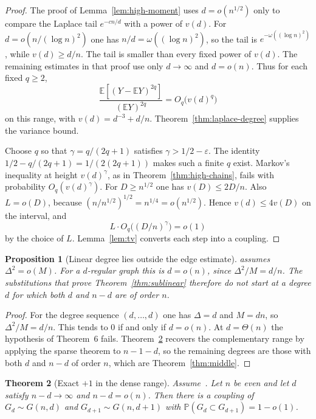 \documentclass[11pt]{article}
\newtheorem{theorem}{Theorem}
\newtheorem{proposition}[theorem]{Proposition}
\newcommand{\Gnd}{G(n,d)}
\newcommand{\EE}{\mathbb{E}}
\newcommand{\PP}{\mathbb{P}}
\begin{document}
\begin{proof}
The proof of Lemma~\ref{lem:high-moment} uses \(d=o(n^{1/2})\) only to compare the
Laplace tail \(e^{-cn/d}\) with a power of \(v(d)\). For
\(d=o(n/(\log n)^2)\) one has \(n/d=\omega((\log n)^2)\), so the tail is
\(e^{-\omega((\log n)^2)}\), while \(v(d)\ge d/n\). The tail is smaller than every
fixed power of \(v(d)\). The remaining estimates in that proof use only
\(d\to\infty\) and \(d=o(n)\). Thus for each fixed \(q\ge 2\),
\[
\frac{\EE[(Y-\EE Y)^{2q}]}{(\EE Y)^{2q}}=O_q\bigl(v(d)^q\bigr)
\]
on this range, with \(v(d)=d^{-3}+d/n\). Theorem~\ref{thm:laplace-degree} supplies
the variance bound.

Choose \(q\) so that \(\gamma=q/(2q+1)\) satisfies \(\gamma>1/2-\varepsilon\). The identity
\(1/2-q/(2q+1)=1/(2(2q+1))\) makes such a finite \(q\) exist. Markov's inequality
at height \(v(d)^\gamma\), as in Theorem~\ref{thm:high-chains}, fails with
probability \(O_q(v(d)^\gamma)\). For \(D\ge n^{1/2}\) one has \(v(D)\le 2D/n\).
Also \(L=o(D)\), because \((n/n^{1/2})^{1/2}=n^{1/4}=o(n^{1/2})\). Hence
\(v(d)\le 4v(D)\) on the interval, and
\[
L\cdot O_q\bigl((D/n)^\gamma\bigr)=o(1)
\]
by the choice of \(L\). Lemma~\ref{lem:tv} converts each step into a coupling.
\end{proof}

\begin{proposition}[Linear degree lies outside the edge estimate]
\label{prop:linear-barrier}
\cite[Theorem~6]{Gao20} assumes \(\Delta^2=o(M)\). For a \(d\)-regular graph this
is \(d=o(n)\), since \(\Delta^2/M=d/n\). The substitutions that prove
Theorem~\ref{thm:sublinear} therefore do not start at a degree \(d\) for which
both \(d\) and \(n-d\) are of order \(n\).
\end{proposition}

\begin{proof}
For the degree sequence \((d,\ldots,d)\) one has \(\Delta=d\) and \(M=dn\), so
\(\Delta^2/M=d/n\). This tends to \(0\) if and only if \(d=o(n)\). At \(d=\Theta(n)\)
the hypothesis of Theorem~6 fails. Theorem~\ref{thm:dense} recovers the
complementary range by applying the sparse theorem to \(n-1-d\), so the
remaining degrees are those with both \(d\) and \(n-d\) of order \(n\), which are Theorem~\ref{thm:middle}.
\end{proof}

\begin{theorem}[Exact \(+1\) in the dense range]
\label{thm:dense}
Assume~\cite[Theorem~6]{Gao20}. Let \(n\) be even and let \(d\) satisfy
\(n-d\to\infty\) and \(n-d=o(n)\). Then there is a coupling of \(G_d\sim\Gnd\)
and \(G_{d+1}\sim G(n,d+1)\) with \(\PP(G_d\subset G_{d+1})=1-o(1)\).
\end{theorem}
\end{document}
